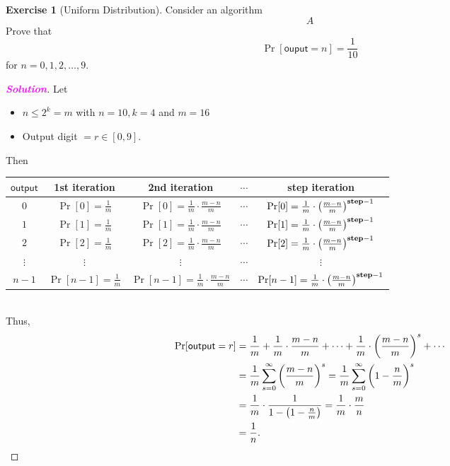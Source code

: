 \documentclass[12pt,openany]{book}
\theoremstyle{definition}
\newtheorem{exercise}{Exercise}[chapter]
\newcommand{\sol}{\textcolor{magenta}{\bf Solution}}
\begin{document}
	\begin{exercise}[Uniform Distribution]
		Consider an algorithm 
		\[
		A
		\]
		Prove that \[
		\Pr[\mathsf{ouput}=n]=\frac{1}{10}
		\] for $n=0,1,2,\dots, 9$.
		\begin{proof}[\sol]
			Let \begin{itemize}
				\item $n\leq 2^k=m$ with $n=10, k=4$ and $m = 16$
				\item Output digit $=r\in[0,9]$.
			\end{itemize} Then \begin{table}[h!]\centering
			\begin{tabularx}{\textwidth}{c||c|c|c|c}
				\toprule[1.2pt]
				$\mathsf{output}$ & \textbf{1st iteration} & \textbf{2nd iteration} & $\cdots$ &\textbf{step iteration}\\
				\midrule
				$0$ & $\Pr[0]=\frac{1}{m}$ & $\Pr[0]=\frac{1}{m}\cdot\frac{m-n}{m}$ & $\cdots$ & $\Pr[0]=\frac{1}{m}\cdot\del{\frac{m-n}{m}}^{\textbf{step}-1}$\\
				$1$ & $\Pr[1]=\frac{1}{m}$ & $\Pr[1]=\frac{1}{m}\cdot\frac{m-n}{m}$ & $\cdots$ & $\Pr[1]=\frac{1}{m}\cdot\del{\frac{m-n}{m}}^{\textbf{step}-1}$\\
				$2$ & $\Pr[2]=\frac{1}{m}$ & $\Pr[2]=\frac{1}{m}\cdot\frac{m-n}{m}$ & $\cdots$ & $\Pr[2]=\frac{1}{m}\cdot\del{\frac{m-n}{m}}^{\textbf{step}-1}$\\
				$\vdots$&$\vdots$&$\vdots$&$\cdots$&$\vdots$\\
				$n-1$ & $\Pr[n-1]=\frac{1}{m}$ & $\Pr[n-1]=\frac{1}{m}\cdot\frac{m-n}{m}$ & $\cdots$ & $\Pr[n-1]=\frac{1}{m}\cdot\del{\frac{m-n}{m}}^{\textbf{step}-1}$\\
				\bottomrule[1.2pt]
			\end{tabularx}
		\end{table}\\ Thus, \begin{align*}
		\Pr[\mathsf{output}=r]&=\frac{1}{m}+\frac{1}{m}\cdot\frac{m-n}{m}+\cdots+\frac{1}{m}\cdot\del{\frac{m-n}{m}}^s+\cdots\\
		&=\frac{1}{m}\sum_{s=0}^\infty\del{\frac{m-n}{m}}^s=\frac{1}{m}\sum_{s=0}^\infty\del{1-\frac{n}{m}}^s\\
		&=\frac{1}{m}\cdot\frac{1}{1-\del{1-\frac{n}{m}}}=\frac{1}{m}\cdot\frac{m}{n}\\
		&=\frac{1}{n}.
\end{align*}
		\end{proof}
	\end{exercise}
	
\end{document}
